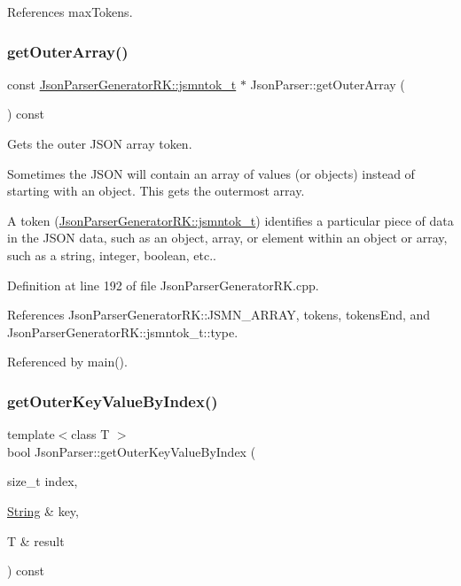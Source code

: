 References max\+Tokens.

\mbox{\label{class_json_parser_a91ffa7e1c4d2fbc2524533d65c31b605}} 
\subsubsection{\texorpdfstring{get\+Outer\+Array()}{getOuterArray()}}
{\footnotesize\ttfamily const \hyperlink{struct_json_parser_generator_r_k_1_1jsmntok__t}{Json\+Parser\+Generator\+R\+K\+::jsmntok\+\_\+t} $\ast$ Json\+Parser\+::get\+Outer\+Array (\begin{DoxyParamCaption}{ }\end{DoxyParamCaption}) const}



Gets the outer J\+S\+ON array token. 

Sometimes the J\+S\+ON will contain an array of values (or objects) instead of starting with an object. This gets the outermost array.

A token (\hyperlink{struct_json_parser_generator_r_k_1_1jsmntok__t}{Json\+Parser\+Generator\+R\+K\+::jsmntok\+\_\+t}) identifies a particular piece of data in the J\+S\+ON data, such as an object, array, or element within an object or array, such as a string, integer, boolean, etc.. 

Definition at line 192 of file Json\+Parser\+Generator\+R\+K.\+cpp.



References Json\+Parser\+Generator\+R\+K\+::\+J\+S\+M\+N\+\_\+\+A\+R\+R\+AY, tokens, tokens\+End, and Json\+Parser\+Generator\+R\+K\+::jsmntok\+\_\+t\+::type.



Referenced by main().

\mbox{\label{class_json_parser_a4718893bc6350e129a9acbf6cb5a47ad}} 
\subsubsection{\texorpdfstring{get\+Outer\+Key\+Value\+By\+Index()}{getOuterKeyValueByIndex()}}
{\footnotesize\ttfamily template$<$class T $>$ \\
bool Json\+Parser\+::get\+Outer\+Key\+Value\+By\+Index (\begin{DoxyParamCaption}\item[{size\+\_\+t}]{index,  }\item[{\hyperlink{class_string}{String} \&}]{key,  }\item[{T \&}]{result }\end{DoxyParamCaption}) const\hspace{0.3cm}{\ttfamily [inline]}}



